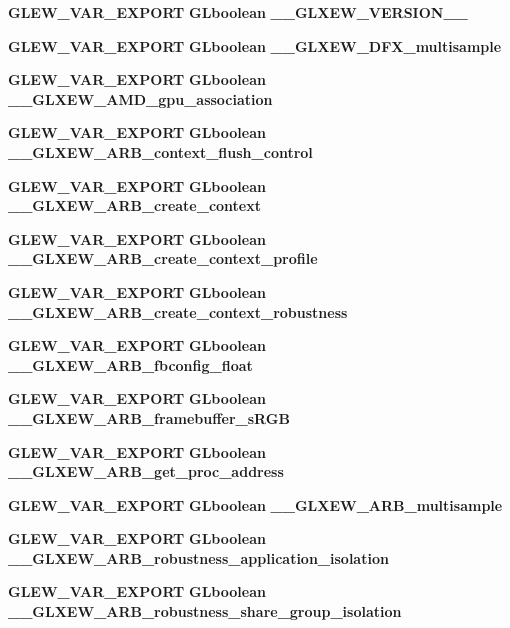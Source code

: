 \begin{DoxyCompactItemize}
\item 
{\bf G\+L\+E\+W\+\_\+\+V\+A\+R\+\_\+\+E\+X\+P\+O\+RT} {\bf G\+Lboolean} {\bf \+\_\+\+\_\+\+G\+L\+X\+E\+W\+\_\+\+V\+E\+R\+S\+I\+O\+N\+\_\+\_}
\item 
{\bf G\+L\+E\+W\+\_\+\+V\+A\+R\+\_\+\+E\+X\+P\+O\+RT} {\bf G\+Lboolean} {\bf \+\_\+\+\_\+\+G\+L\+X\+E\+W\+\_\+D\+F\+X\+\_\+multisample}
\item 
{\bf G\+L\+E\+W\+\_\+\+V\+A\+R\+\_\+\+E\+X\+P\+O\+RT} {\bf G\+Lboolean} {\bf \+\_\+\+\_\+\+G\+L\+X\+E\+W\+\_\+\+A\+M\+D\+\_\+gpu\+\_\+association}
\item 
{\bf G\+L\+E\+W\+\_\+\+V\+A\+R\+\_\+\+E\+X\+P\+O\+RT} {\bf G\+Lboolean} {\bf \+\_\+\+\_\+\+G\+L\+X\+E\+W\+\_\+\+A\+R\+B\+\_\+context\+\_\+flush\+\_\+control}
\item 
{\bf G\+L\+E\+W\+\_\+\+V\+A\+R\+\_\+\+E\+X\+P\+O\+RT} {\bf G\+Lboolean} {\bf \+\_\+\+\_\+\+G\+L\+X\+E\+W\+\_\+\+A\+R\+B\+\_\+create\+\_\+context}
\item 
{\bf G\+L\+E\+W\+\_\+\+V\+A\+R\+\_\+\+E\+X\+P\+O\+RT} {\bf G\+Lboolean} {\bf \+\_\+\+\_\+\+G\+L\+X\+E\+W\+\_\+\+A\+R\+B\+\_\+create\+\_\+context\+\_\+profile}
\item 
{\bf G\+L\+E\+W\+\_\+\+V\+A\+R\+\_\+\+E\+X\+P\+O\+RT} {\bf G\+Lboolean} {\bf \+\_\+\+\_\+\+G\+L\+X\+E\+W\+\_\+\+A\+R\+B\+\_\+create\+\_\+context\+\_\+robustness}
\item 
{\bf G\+L\+E\+W\+\_\+\+V\+A\+R\+\_\+\+E\+X\+P\+O\+RT} {\bf G\+Lboolean} {\bf \+\_\+\+\_\+\+G\+L\+X\+E\+W\+\_\+\+A\+R\+B\+\_\+fbconfig\+\_\+float}
\item 
{\bf G\+L\+E\+W\+\_\+\+V\+A\+R\+\_\+\+E\+X\+P\+O\+RT} {\bf G\+Lboolean} {\bf \+\_\+\+\_\+\+G\+L\+X\+E\+W\+\_\+\+A\+R\+B\+\_\+framebuffer\+\_\+s\+R\+GB}
\item 
{\bf G\+L\+E\+W\+\_\+\+V\+A\+R\+\_\+\+E\+X\+P\+O\+RT} {\bf G\+Lboolean} {\bf \+\_\+\+\_\+\+G\+L\+X\+E\+W\+\_\+\+A\+R\+B\+\_\+get\+\_\+proc\+\_\+address}
\item 
{\bf G\+L\+E\+W\+\_\+\+V\+A\+R\+\_\+\+E\+X\+P\+O\+RT} {\bf G\+Lboolean} {\bf \+\_\+\+\_\+\+G\+L\+X\+E\+W\+\_\+\+A\+R\+B\+\_\+multisample}
\item 
{\bf G\+L\+E\+W\+\_\+\+V\+A\+R\+\_\+\+E\+X\+P\+O\+RT} {\bf G\+Lboolean} {\bf \+\_\+\+\_\+\+G\+L\+X\+E\+W\+\_\+\+A\+R\+B\+\_\+robustness\+\_\+application\+\_\+isolation}
\item 
{\bf G\+L\+E\+W\+\_\+\+V\+A\+R\+\_\+\+E\+X\+P\+O\+RT} {\bf G\+Lboolean} {\bf \+\_\+\+\_\+\+G\+L\+X\+E\+W\+\_\+\+A\+R\+B\+\_\+robustness\+\_\+share\+\_\+group\+\_\+isolation}

\end{DoxyCompactItemize}

